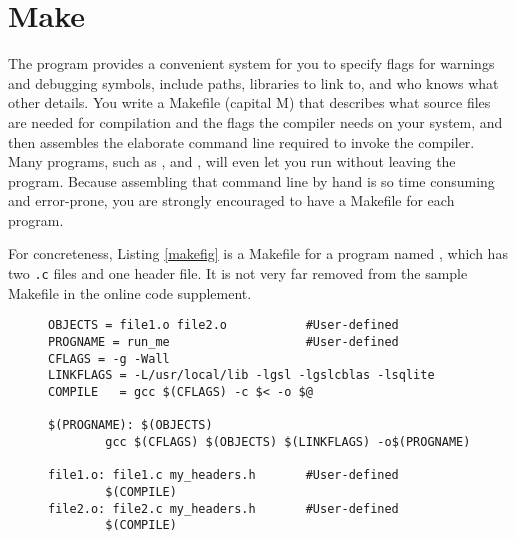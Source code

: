 

\section{Make} \label{make} 
The  program provides a convenient system for you to specify
flags for warnings and debugging symbols, include paths, libraries to
link to, and who knows what other details.  You write a Makefile (capital
M) that describes what source files are needed for compilation and the
flags the compiler needs on your system, and then  assembles the
elaborate command line required to invoke the compiler. Many programs,
such as ,  and , will even let you run
 without leaving the program.  Because assembling that command
line by hand is so time consuming and error-prone, you are strongly
encouraged to have a Makefile for each program.

For concreteness, 
Listing \ref{makefig} is a Makefile for a program named ,
which has two {\tt .c} files and one header file. It is not very far
removed from the sample Makefile in the online code supplement.

\begin{figure}[htb]
\begin{lstlisting}
OBJECTS = file1.o file2.o           #User-defined
PROGNAME = run_me                   #User-defined
CFLAGS = -g -Wall
LINKFLAGS = -L/usr/local/lib -lgsl -lgslcblas -lsqlite
COMPILE   = gcc $(CFLAGS) -c $< -o $@

$(PROGNAME): $(OBJECTS)
        gcc $(CFLAGS) $(OBJECTS) $(LINKFLAGS) -o$(PROGNAME)

file1.o: file1.c my_headers.h       #User-defined
        $(COMPILE)
file2.o: file2.c my_headers.h       #User-defined
        $(COMPILE)
\end{lstlisting}
    \setlistdefaults
\end{figure}

